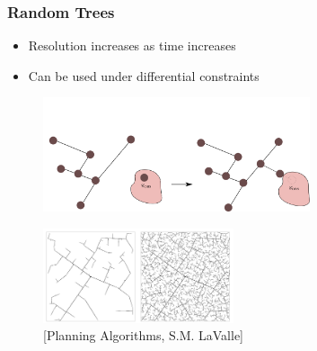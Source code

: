 \documentclass{beamer}
\begin{document}
	\begin{frame}
		\frametitle{Random Trees}

		\begin{itemize}

			\item

				Resolution increases as time increases

			\item

				Can be used under differential constraints

		\end{itemize}

		\begin{figure}[h]
			\centering
			\includegraphics[width=0.7\textwidth]{RRT}
		\end{figure}

		\begin{figure}[h]
			\centering
			\includegraphics[width=0.5\textwidth]{RRT_denseness}
			\caption{[Planning Algorithms, S.M. LaValle]}
		\end{figure}

	\end{frame}
\end{document}
